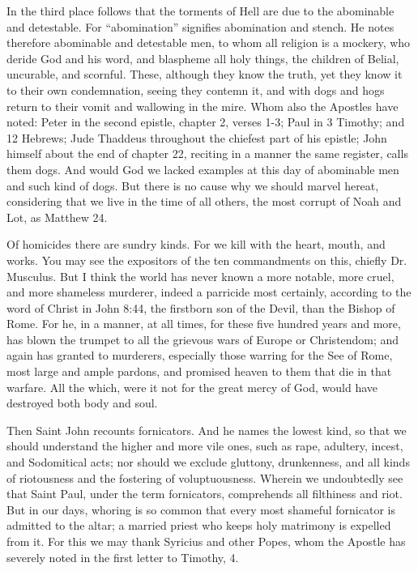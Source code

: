 In the third place follows that the torments of Hell are due to the abominable and detestable. For “abomination” signifies abomination and stench. He notes therefore abominable and detestable men, to whom all religion is a mockery, who deride God and his word, and blaspheme all holy things, the children of Belial, uncurable, and scornful. These, although they know the truth, yet they know it to their own condemnation, seeing they contemn it, and with dogs and hogs return to their vomit and wallowing in the mire. Whom also the Apostles have noted: Peter in the second epistle, chapter 2, verses 1-3; Paul in 3 Timothy; and 12 Hebrews; Jude Thaddeus throughout the chiefest part of his epistle; John himself about the end of chapter 22, reciting in a manner the same register, calls them dogs. And would God we lacked examples at this day of abominable men and such kind of dogs. But there is no cause why we should marvel hereat, considering that we live in the time of all others, the most corrupt of Noah and Lot, as Matthew 24.

Of homicides there are sundry kinds. For we kill with the heart, mouth, and works. You may see the expositors of the ten commandments on this, chiefly Dr. Musculus. But I think the world has never known a more notable, more cruel, and more shameless murderer, indeed a parricide most certainly, according to the word of Christ in John 8:44, the firstborn son of the Devil, than the Bishop of Rome. For he, in a manner, at all times, for these five hundred years and more, has blown the trumpet to all the grievous wars of Europe or Christendom; and again has granted to murderers, especially those warring for the See of Rome, most large and ample pardons, and promised heaven to them that die in that warfare. All the which, were it not for the great mercy of God, would have destroyed both body and soul.

Then Saint John recounts fornicators. And he names the lowest kind, so that we should understand the higher and more vile ones, such as rape, adultery, incest, and Sodomitical acts; nor should we exclude gluttony, drunkenness, and all kinds of riotousness and the fostering of voluptuousness. Wherein we undoubtedly see that Saint Paul, under the term fornicators, comprehends all filthiness and riot. But in our days, whoring is so common that every most shameful fornicator is admitted to the altar; a married priest who keeps holy matrimony is expelled from it. For this we may thank Syricius and other Popes, whom the Apostle has severely noted in the first letter to Timothy, 4.

